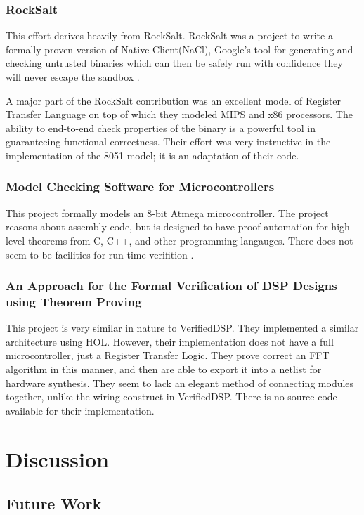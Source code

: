\documentclass[preprint,12pt]{sigplanconf}
\begin{document}
\subsubsection{RockSalt}
This effort derives heavily from RockSalt. RockSalt was a project to
write a formally proven version of Native Client(NaCl), Google's tool
for generating and checking untrusted binaries which can then be
safely run with confidence they will never escape the sandbox
\cite{rocksalt}.

A major part of the RockSalt contribution was an excellent model of
Register Transfer Language on top of which they modeled MIPS and x86
processors. The ability to end-to-end check properties of the binary
is a powerful tool in guaranteeing functional correctness. Their
effort was very instructive in the implementation of the 8051
model; it is an adaptation of their code.
\subsubsection{Model Checking Software for Microcontrollers}
This project formally models an 8-bit Atmega microcontroller.
The project reasons about assembly code, but is designed to have proof
automation for high level theorems from C, C++, and other programming langauges.
There does not seem to be facilities for run time verifition \cite{mcsm}.

\subsubsection{An Approach for the Formal Verification of DSP Designs
  using Theorem Proving}
This project is very similar in nature to VerifiedDSP. They
implemented a similar architecture using HOL. However, their
implementation does not have a full microcontroller, just a Register
Transfer Logic. They prove correct an FFT algorithm in this manner,
and then are able to export it into a netlist for hardware synthesis.
They seem to lack an elegant method of connecting modules together,
unlike the wiring construct in VerifiedDSP.  There is no source code
available for their implementation\cite{dspprove}.

\section{Discussion}
\subsection{Future Work}
\end{document}
